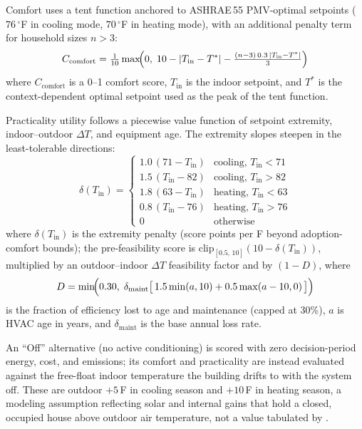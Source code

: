 \documentclass[final,3p,times]{elsarticle}
\begin{document}
Comfort uses a tent function anchored to ASHRAE\,55 PMV-optimal setpoints \cite{ashrae55_2020} ($76\,^\circ$F in cooling mode, $70\,^\circ$F in heating mode), with an additional penalty term for household sizes $n > 3$:
\begin{equation}
  C_{\mathrm{comfort}} = \tfrac{1}{10}\max\!\Bigl(0,\; 10 - \lvert T_{\mathrm{in}} - T^{*}\rvert - \tfrac{(n-3)\,0.3\,\lvert T_{\mathrm{in}} - T^{*}\rvert}{3}\Bigr)
  \label{eq:hvac_comfort}
\end{equation}
\noindent where $C_{\mathrm{comfort}}$ is a 0--1 comfort score, $T_{\mathrm{in}}$ is the indoor setpoint, and $T^{*}$ is the context-dependent optimal setpoint used as the peak of the tent function.

Practicality utility follows a piecewise value function of setpoint extremity, indoor--outdoor $\Delta T$, and equipment age. The extremity slopes steepen in the least-tolerable directions:
\begin{equation}
  \delta(T_{\mathrm{in}}) =
  \begin{cases}
    1.0\,(71 - T_{\mathrm{in}}) & \text{cooling, } T_{\mathrm{in}} < 71 \\[3pt]
    1.5\,(T_{\mathrm{in}} - 82) & \text{cooling, } T_{\mathrm{in}} > 82 \\[3pt]
    1.8\,(63 - T_{\mathrm{in}}) & \text{heating, } T_{\mathrm{in}} < 63 \\[3pt]
    0.8\,(T_{\mathrm{in}} - 76) & \text{heating, } T_{\mathrm{in}} > 76 \\[3pt]
    0                             & \text{otherwise}
  \end{cases}
  \label{eq:hvac_practicality}
\end{equation}
\noindent where $\delta(T_{\mathrm{in}})$ is the extremity penalty (score points per \textdegree{}F beyond adoption-comfort bounds); the pre-feasibility score is $\mathrm{clip}_{[0.5,\,10]}(10-\delta(T_{\mathrm{in}}))$, multiplied by an outdoor--indoor $\Delta T$ feasibility factor and by $(1-D)$, where
\begin{equation}
  D = \min\!\Bigl(0.30,\; \delta_{\mathrm{maint}}\bigl[\,1.5\min(a,10) + 0.5\max(a-10,0)\,\bigr]\Bigr)
  \label{eq:hvac_degradation}
\end{equation}
\noindent is the fraction of efficiency lost to age and maintenance (capped at 30\%), $a$ is HVAC age in years, and $\delta_{\mathrm{maint}}$ is the base annual loss rate.

An ``Off'' alternative (no active conditioning) is scored with zero decision-period energy, cost, and emissions; its comfort and practicality are instead evaluated against the free-float indoor temperature the building drifts to with the system off. These are outdoor $+5$\,\textdegree{}F in cooling season and $+10$\,\textdegree{}F in heating season, a modeling assumption reflecting solar and internal gains that hold a closed, occupied house above outdoor air temperature, not a value tabulated by \cite{ashrae55_2020,accamanualj}.
\end{document}
